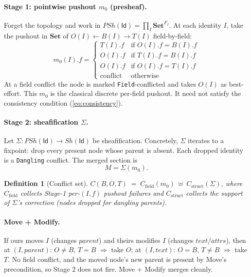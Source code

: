 \documentclass[11pt,a4paper]{article}
\newtheorem{definition}[theorem]{Definition}
\newcommand{\Id}{\mathsf{Id}}
\begin{document}
\paragraph{Stage 1: pointwise pushout $m_0$ (presheaf).}
Forget the topology and work in $PSh(\Id) = \prod_I \mathbf{Set}^{F_I}$.
At each identity $I$, take the pushout in $\mathbf{Set}$ of
$O(I) \leftarrow B(I) \rightarrow T(I)$ field-by-field:
\[
m_0(I).f = \begin{cases}
T(I).f & \text{if } O(I).f = B(I).f \\
O(I).f & \text{if } T(I).f = B(I).f \\
O(I).f & \text{if } O(I).f = T(I).f \\
\text{conflict} & \text{otherwise}
\end{cases}
\]
At a field conflict the node is marked \texttt{Field}-conflicted and takes
$O(I)$ as best-effort. This $m_0$ is the classical discrete per-field
pushout. It need not satisfy the consistency condition (\ref{eq:consistency}).

\paragraph{Stage 2: sheafification $\Sigma$.}
Let $\Sigma : PSh(\Id) \to Sh(\Id)$ be sheafification. Concretely, $\Sigma$
iterates to a fixpoint: drop every present node whose parent is absent.
Each dropped identity is a \texttt{Dangling} conflict. The merged section is
\[
M = \Sigma(m_0).
\]

\begin{definition}[Conflict set]
$C(B,O,T) \;=\; C_{\text{field}}(m_0) \;\uplus\; C_{\text{struct}}(\Sigma)$,
where $C_{\text{field}}$ collects Stage-1 per-$(I,f)$ pushout failures and
$C_{\text{struct}}$ collects the support of $\Sigma$'s correction (nodes
dropped for dangling parents).
\end{definition}

\paragraph{Move + Modify.}
If ours moves $I$ (changes $parent$) and theirs modifies $I$ (changes
$text$/$attrs$), then at $(I,parent)$: $O \neq B$, $T = B$ $\Rightarrow$
take $O$; at $(I,text)$: $O = B$, $T \neq B$ $\Rightarrow$ take $T$. No
field conflict, and the moved node's new parent is present by Move's
precondition, so Stage 2 does not fire. Move + Modify merges cleanly.
\end{document}

